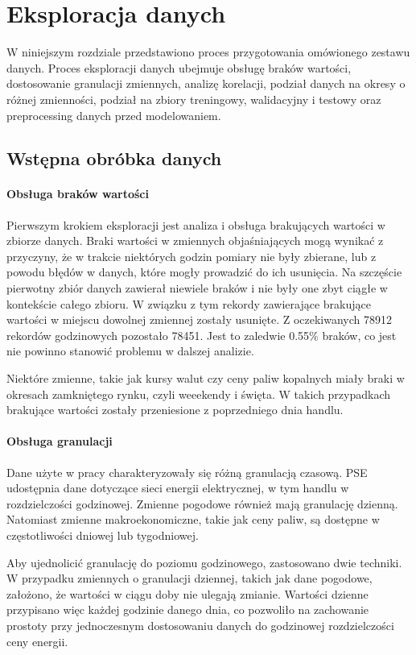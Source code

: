 \chapter{Eksploracja danych}
\label{sec:eksploracja}

W niniejszym rozdziale przedstawiono proces przygotowania omówionego zestawu danych. Proces eksploracji danych ubejmuje obsługę braków wartości, dostosowanie granulacji zmiennych, analizę korelacji, podział danych na okresy o różnej zmienności, podział na zbiory treningowy, walidacyjny i testowy oraz preprocessing danych przed modelowaniem.

\section{Wstępna obróbka danych}
\subsubsection{Obsługa braków wartości}
Pierwszym krokiem eksploracji jest analiza i obsługa brakujących wartości w zbiorze danych. Braki wartości w zmiennych objaśniających mogą wynikać z przyczyny, że w trakcie niektórych godzin pomiary nie były zbierane, lub z powodu błędów w danych, które mogły prowadzić do ich usunięcia. Na szczęście pierwotny zbiór danych zawierał niewiele braków i nie były one zbyt ciągłe w kontekście całego zbioru. W związku z tym rekordy zawierające brakujące wartości w miejscu dowolnej zmiennej zostały usunięte. Z oczekiwanych 78912 rekordów godzinowych pozostało 78451. Jest to zaledwie 0.55\% braków, co jest nie powinno stanowić problemu w dalszej analizie.

Niektóre zmienne, takie jak kursy walut czy ceny paliw kopalnych miały braki w okresach zamkniętego rynku, czyli weeekendy i święta. W takich przypadkach brakujące wartości zostały przeniesione z poprzedniego dnia handlu. 

\subsubsection{Obsługa granulacji}
Dane użyte w pracy charakteryzowały się różną granulacją czasową. PSE udostępnia dane dotyczące sieci energii elektrycznej, w tym handlu w rozdzielczości godzinowej. Zmienne pogodowe również mają granulację dzienną. Natomiast zmienne makroekonomiczne, takie jak ceny paliw, są dostępne w częstotliwości dniowej lub tygodniowej.

Aby ujednolicić granulację do poziomu godzinowego, zastosowano dwie techniki. W przypadku zmiennych o granulacji dziennej, takich jak dane pogodowe, założono, że wartości w ciągu doby nie ulegają zmianie. Wartości dzienne przypisano więc każdej godzinie danego dnia, co pozwoliło na zachowanie prostoty przy jednoczesnym dostosowaniu danych do godzinowej rozdzielczości ceny energii. 

